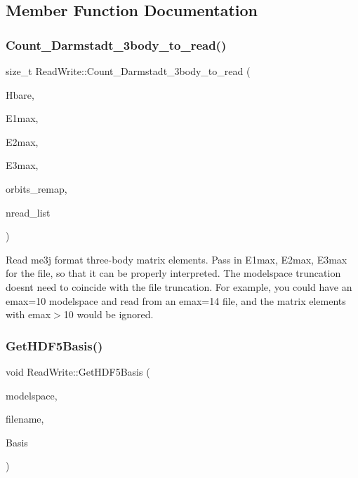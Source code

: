 \subsection{Member Function Documentation}
\mbox{\label{classReadWrite_a636e7da4d6fc6a96136afdbf61dddaba}} 
\subsubsection{\texorpdfstring{Count\+\_\+\+Darmstadt\+\_\+3body\+\_\+to\+\_\+read()}{Count\_Darmstadt\_3body\_to\_read()}}
{\footnotesize\ttfamily size\+\_\+t Read\+Write\+::\+Count\+\_\+\+Darmstadt\+\_\+3body\+\_\+to\+\_\+read (\begin{DoxyParamCaption}\item[{\hyperlink{classOperator}{Operator} \&}]{Hbare,  }\item[{int}]{E1max,  }\item[{int}]{E2max,  }\item[{int}]{E3max,  }\item[{std\+::vector$<$ int $>$ \&}]{orbits\+\_\+remap,  }\item[{std\+::vector$<$ size\+\_\+t $>$ \&}]{nread\+\_\+list }\end{DoxyParamCaption})}

Read me3j format three-\/body matrix elements. Pass in E1max, E2max, E3max for the file, so that it can be properly interpreted. The modelspace truncation doesn\textquotesingle{}t need to coincide with the file truncation. For example, you could have an emax=10 modelspace and read from an emax=14 file, and the matrix elements with emax$>$10 would be ignored. \mbox{\label{classReadWrite_afd7a125b17416dff8f734552162f9452}} 
\subsubsection{\texorpdfstring{Get\+H\+D\+F5\+Basis()}{GetHDF5Basis()}}
{\footnotesize\ttfamily void Read\+Write\+::\+Get\+H\+D\+F5\+Basis (\begin{DoxyParamCaption}\item[{\hyperlink{classModelSpace}{Model\+Space} $\ast$}]{modelspace,  }\item[{std\+::string}]{filename,  }\item[{std\+::vector$<$ std\+::array$<$ int, 5 $>$$>$ \&}]{Basis }\end{DoxyParamCaption})}

